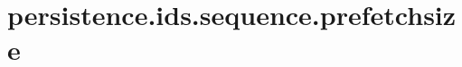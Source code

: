 \section{persistence.ids.sequence.prefetchsize}
\label{configuration:PersistenceIdsSequencePrefetchsize}
\TODO
